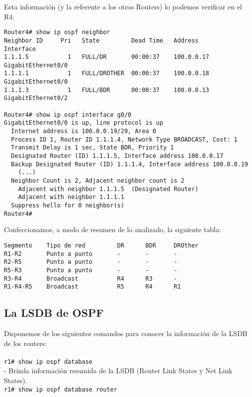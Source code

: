 \documentclass{article}
\begin{document}
Esta informaci\'on (y la referente a los otros Routers) lo podemos verificar en el R4:

\begin{verbatim}
Router4# show ip ospf neighbor
Neighbor ID     Pri   State         Dead Time   Address         Interface
1.1.1.5           1   FULL/DR       00:00:37    100.0.0.17      GigabitEthernet0/0
1.1.1.1           1   FULL/DROTHER  00:00:37    100.0.0.18      GigabitEthernet0/0
1.1.1.3           1   FULL/BDR      00:00:37    100.0.0.13      GigabitEthernet0/2

Router4# show ip ospf interface g0/0
GigabitEthernet0/0 is up, line protocol is up
  Internet address is 100.0.0.19/29, Area 0
  Process ID 1, Router ID 1.1.1.4, Network Type BROADCAST, Cost: 1
  Transmit Delay is 1 sec, State BDR, Priority 1
  Designated Router (ID) 1.1.1.5, Interface address 100.0.0.17
  Backup Designated Router (ID) 1.1.1.4, Interface address 100.0.0.19
	(...)
  Neighbor Count is 2, Adjacent neighbor count is 2
    Adjacent with neighbor 1.1.1.5  (Designated Router)
    Adjacent with neighbor 1.1.1.1
  Suppress hello for 0 neighbor(s)
Router4#

\end{verbatim}

Confeccionamos, a modo de resumen de lo analizado, la siguiente tabla:
\begin{verbatim}
Segmento    Tipo de red         DR      BDR     DROther
R1-R2       Punto a punto       -       -       -
R2-R5       Punto a punto       -       -       -
R5-R3       Punto a punto       -       -       -
R3-R4       Broadcast           R4      R3      -
R1-R4-R5    Broadcast           R5      R4      R1

\end{verbatim}

\subsection{La LSDB de OSPF}

Disponemos de los siguientes comandos para conocer la informaci\'on de la LSDB de los routers: \\\\

\texttt{r1\# show ip ospf database} \\

- Brinda informaci\'on resumida de la LSDB (Router Link States y Net Link States). \\

\texttt{r1\# show ip ospf database router} \\
\end{document}
